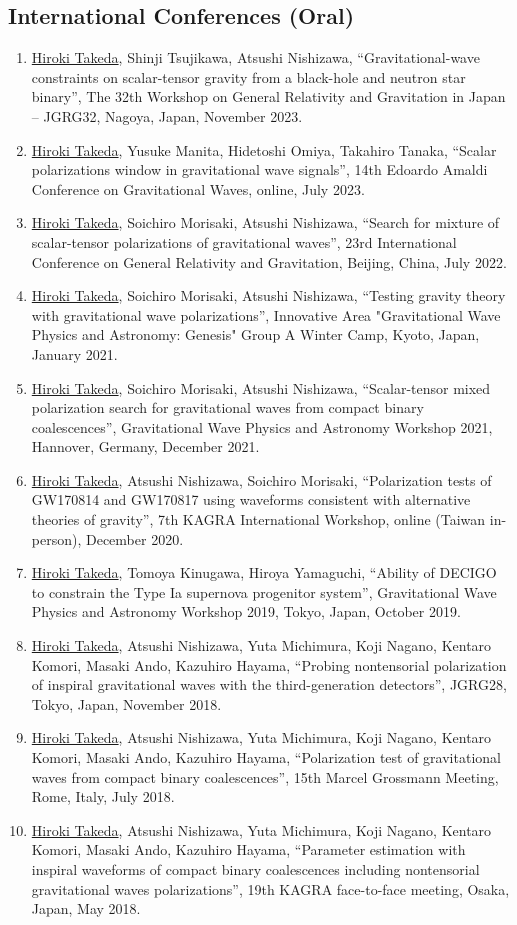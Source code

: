 \documentclass[uplatex, 12pt]{article}
\begin{document}
\subsection*{International Conferences (Oral)}
\begin{enumerate}
\item \uline{Hiroki Takeda}, Shinji Tsujikawa, Atsushi Nishizawa, “Gravitational-wave constraints on scalar-tensor gravity from a black-hole and neutron star binary”, The 32th Workshop on General Relativity and Gravitation in Japan – JGRG32, Nagoya, Japan, November 2023.
\item \uline{Hiroki Takeda}, Yusuke Manita, Hidetoshi Omiya, Takahiro Tanaka, “Scalar polarizations window in gravitational wave signals”, 14th Edoardo Amaldi Conference on Gravitational Waves, online, July 2023.
\item \uline{Hiroki Takeda}, Soichiro Morisaki, Atsushi Nishizawa, “Search for mixture of scalar-tensor polarizations of gravitational waves”, 23rd International Conference on General Relativity and Gravitation, Beijing, China, July 2022.
\item \uline{Hiroki Takeda}, Soichiro Morisaki, Atsushi Nishizawa, “Testing gravity theory with gravitational wave polarizations”, Innovative Area "Gravitational Wave Physics and Astronomy: Genesis" Group A Winter Camp, Kyoto, Japan, January 2021.
\item \uline{Hiroki Takeda}, Soichiro Morisaki, Atsushi Nishizawa, “Scalar-tensor mixed polarization search for gravitational waves from compact binary coalescences”, Gravitational Wave Physics and Astronomy Workshop 2021, Hannover, Germany, December 2021.
\item \uline{Hiroki Takeda}, Atsushi Nishizawa, Soichiro Morisaki, “Polarization tests of GW170814 and GW170817 using waveforms consistent with alternative theories of gravity”, 7th KAGRA International Workshop, online (Taiwan in-person), December 2020.
\item \uline{Hiroki Takeda}, Tomoya Kinugawa, Hiroya Yamaguchi, “Ability of DECIGO to constrain the Type Ia supernova progenitor system”, Gravitational Wave Physics and Astronomy Workshop 2019, Tokyo, Japan, October 2019.
\item \uline{Hiroki Takeda}, Atsushi Nishizawa, Yuta Michimura, Koji Nagano, Kentaro Komori, Masaki Ando, Kazuhiro Hayama, “Probing nontensorial polarization of inspiral gravitational waves with the third-generation detectors”, JGRG28, Tokyo, Japan, November 2018.
\item \uline{Hiroki Takeda}, Atsushi Nishizawa, Yuta Michimura, Koji Nagano, Kentaro Komori, Masaki Ando, Kazuhiro Hayama, “Polarization test of gravitational waves from compact binary coalescences”, 15th Marcel Grossmann Meeting, Rome, Italy, July 2018.
\item \uline{Hiroki Takeda}, Atsushi Nishizawa, Yuta Michimura, Koji Nagano, Kentaro Komori, Masaki Ando, Kazuhiro Hayama, “Parameter estimation with inspiral waveforms of compact binary coalescences including nontensorial gravitational waves polarizations”, 19th KAGRA face-to-face meeting, Osaka, Japan, May 2018.
\end{enumerate}
\end{document}
